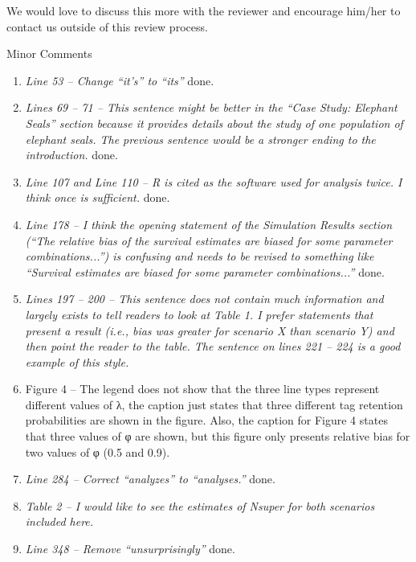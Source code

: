 \documentclass[12pt]{article}
\begin{document}
\begin{enumerate}
We would love to discuss this more with the reviewer and encourage him/her to contact us outside of this review process.

\noindent Minor Comments
\begin{enumerate}
\item {\it Line 53 – Change “it’s” to “its”} 
done.

\item {\it Lines 69 – 71 – This sentence might be better in the “Case Study: Elephant Seals” section because it provides details about the study of one population of elephant seals. The previous sentence would be a stronger ending to the introduction.} 
done.

\item {\it Line 107 and Line 110 – R is cited as the software used for analysis twice. I think once is sufficient.} 
done.

\item {\it Line 178 – I think the opening statement of the Simulation Results section (“The relative bias of the survival estimates are biased for some parameter combinations...”) is confusing and needs to be revised to something like “Survival estimates are biased for some parameter combinations...”} 
done.

\item {\it Lines 197 – 200 – This sentence does not contain much information and largely exists to tell readers to look at Table 1. I prefer statements that present a result (i.e., bias was greater for scenario X than scenario Y) and then point the reader to the table. The sentence on lines 221 – 224 is a good example of this style.}

\item{Figure 4 – The legend does not show that the three line types represent different values of λ, the caption just states that three different tag retention probabilities are shown in the figure. Also, the caption for Figure 4 states that three values of φ are shown, but this figure only presents relative bias for two values of φ (0.5 and 0.9).}

\item {\it Line 284 – Correct “analyzes” to “analyses.”} 
done.

\item {\it Table 2 – I would like to see the estimates of Nsuper for both scenarios included here.}

\item {\it Line 348 – Remove “unsurprisingly”} 
done.


\end{enumerate}
\end{enumerate}
\end{document}
